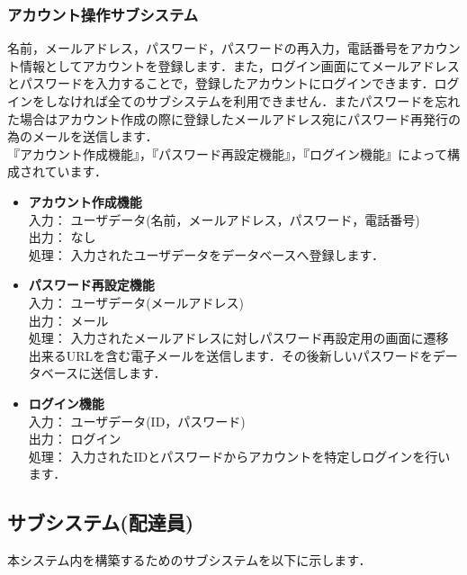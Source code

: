\documentclass[a4j,titlepage]{jarticle}
\begin{document}
\subsubsection{アカウント操作サブシステム}
名前，メールアドレス，パスワード，パスワードの再入力，電話番号をアカウント情報としてアカウントを登録します．また，ログイン画面にてメールアドレスとパスワードを入力することで，登録したアカウントにログインできます．ログインをしなければ全てのサブシステムを利用できません．またパスワードを忘れた場合はアカウント作成の際に登録したメールアドレス宛にパスワード再発行の為のメールを送信します． \\
『アカウント作成機能』，『パスワード再設定機能』，『ログイン機能』によって構成されています．
\begin{itemize}
\item \textbf{アカウント作成機能} \\
入力： ユーザデータ(名前，メールアドレス，パスワード，電話番号) \\
出力： なし \\
処理： 入力されたユーザデータをデータベースへ登録します．
\item \textbf{パスワード再設定機能} \\
入力： ユーザデータ(メールアドレス) \\
出力： メール \\
処理： 入力されたメールアドレスに対しパスワード再設定用の画面に遷移出来るURLを含む電子メールを送信します．その後新しいパスワードをデータベースに送信します．
\item \textbf{ログイン機能} \\
入力： ユーザデータ(ID，パスワード) \\
出力： ログイン \\
処理： 入力されたIDとパスワードからアカウントを特定しログインを行います．
\end{itemize}

\newpage

\subsection{サブシステム(配達員)}
本システム内を構築するためのサブシステムを以下に示します．
\end{document}
